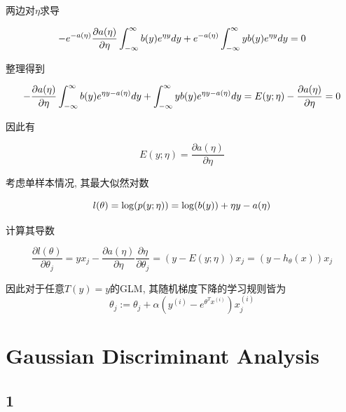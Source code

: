 \documentclass{ctexart}
\begin{document}
两边对$\eta$求导

\begin{equation}
	-e^{-a(\eta)}\frac{\partial a(\eta)}{\partial \eta} \int_{-\infty}^{\infty} b(y)e^{\eta y}dy + e^{-a(\eta)} \int_{-\infty}^{\infty} yb(y)e^{\eta y}dy = 0 \notag
\end{equation}

整理得到

\begin{equation}
-\frac{\partial a(\eta)}{\partial \eta} \int_{-\infty}^{\infty} b(y)e^{\eta y - a(\eta)}dy +  \int_{-\infty}^{\infty} yb(y)e^{\eta y - a(\eta)}dy = E(y;\eta) - \frac{\partial a(\eta)}{\partial \eta} = 0 \notag
\end{equation}

因此有

\begin{equation}
	E(y;\eta) = \frac{\partial a(\eta)}{\partial \eta}
\end{equation}

考虑单样本情况, 其最大似然对数

\begin{equation}
	l(\theta) = \log(p(y;\eta)) = \log(b(y)) + \eta y - a(\eta) \notag
\end{equation}

计算其导数

\begin{equation}
\frac{\partial l(\theta)}{\partial \theta_j} = yx_j - \frac{\partial a(\eta)}{\partial \eta} \frac{\partial \eta}{\partial \theta_j} = (y - E(y;\eta))x_j = (y-h_\theta(x))x_j
\end{equation}

因此对于任意$T(y) = y$的GLM, 其随机梯度下降的学习规则皆为
\begin{equation}
\theta_j:= \theta_j + \alpha(y^{(i)} - e^{\theta^Tx^{(i)}})x_j^{(i)}
\end{equation}

\section{Gaussian Discriminant Analysis}

\subsection{1}
\end{document}
